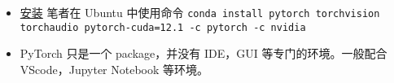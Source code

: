 

\begin{itemize}
\item \href{https://pytorch.org/get-started/locally/}{安装} 笔者在 Ubuntu 中使用命令 \verb|conda install pytorch torchvision torchaudio pytorch-cuda=12.1 -c pytorch -c nvidia|
\item PyTorch 只是一个 package，并没有 IDE，GUI 等专门的环境。一般配合 VScode，Jupyter Notebook 等环境。
\end{itemize}
